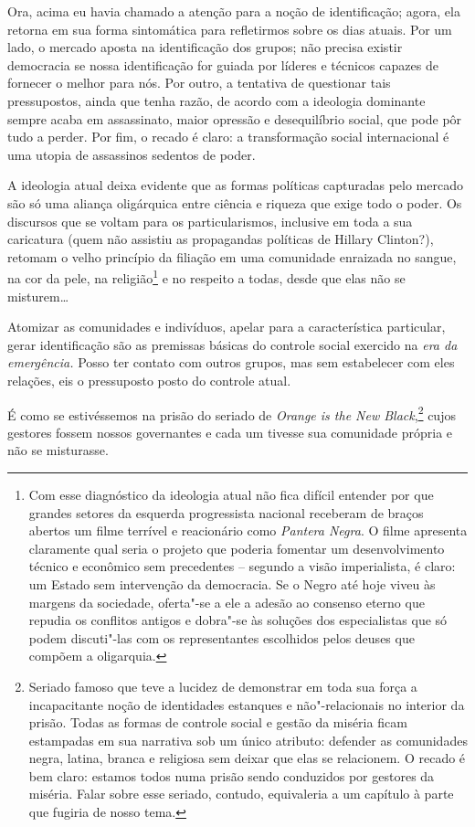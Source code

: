 Ora, acima eu havia chamado a atenção para a noção de identificação;
agora, ela retorna em sua forma sintomática para refletirmos sobre os
dias atuais. Por um lado, o mercado aposta na identificação dos grupos;
não precisa existir democracia se nossa identificação for guiada por
líderes e técnicos capazes de fornecer o melhor para nós. Por outro, a
tentativa de questionar tais pressupostos, ainda que tenha razão, de
acordo com a ideologia dominante sempre acaba em assassinato, maior
opressão e desequilíbrio social, que pode pôr tudo a perder. Por fim, o
recado é claro: a transformação social internacional é uma utopia de
assassinos sedentos de poder.

A ideologia atual deixa evidente que as formas políticas capturadas pelo
mercado são só uma aliança oligárquica entre ciência e riqueza que exige
todo o poder. Os discursos que se voltam para os particularismos,
inclusive em toda a sua caricatura (quem não assistiu as propagandas
políticas de Hillary Clinton?), retomam o velho princípio da filiação em
uma comunidade enraizada no sangue, na cor da pele, na
religião\footnote{Com esse diagnóstico da ideologia atual não fica
  difícil entender por que grandes setores da esquerda progressista
  nacional receberam de braços abertos um filme terrível e reacionário
  como \emph{Pantera Negra}. O filme apresenta claramente qual seria o
  projeto que poderia fomentar um desenvolvimento técnico e econômico
  sem precedentes -- segundo a visão imperialista, é claro: um Estado
  sem intervenção da democracia. Se o Negro até hoje viveu às margens da
  sociedade, oferta"-se a ele a adesão ao consenso eterno que repudia os
  conflitos antigos e dobra"-se às soluções dos especialistas que só
  podem discuti"-las com os representantes escolhidos pelos deuses que
  compõem a oligarquia.} e no respeito a todas, desde que elas não se
misturem\ldots{}

Atomizar as comunidades e indivíduos, apelar para a característica
particular, gerar identificação são as premissas básicas do controle
social exercido na \emph{era da emergência.} Posso ter contato com
outros grupos, mas sem estabelecer com eles relações, eis o pressuposto
posto do controle atual.

É como se estivéssemos na prisão do seriado de \emph{Orange is the New
Black},\footnote{Seriado famoso que teve a lucidez de demonstrar em toda
  sua força a incapacitante noção de identidades estanques e
  não"-relacionais no interior da prisão. Todas as formas de controle
  social e gestão da miséria ficam estampadas em sua narrativa sob um
  único atributo: defender as comunidades negra, latina, branca e
  religiosa sem deixar que elas se relacionem. O recado é bem claro:
  estamos todos numa prisão sendo conduzidos por gestores da miséria.
  Falar sobre esse seriado, contudo, equivaleria a um capítulo à parte
  que fugiria de nosso tema.} cujos gestores fossem nossos
governantes e cada um tivesse sua comunidade própria e não se
misturasse.

